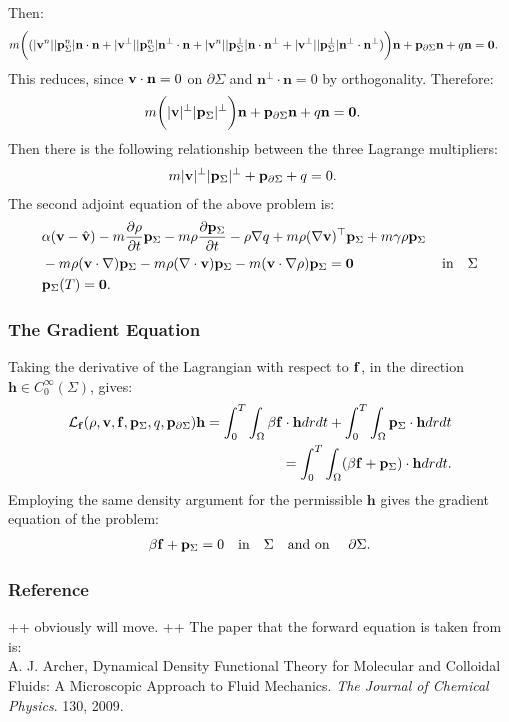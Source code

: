 Then:
\begin{align*}
&m \bigg((|\mathbf{v}^n||\mathbf{p}_\Sigma^n|\mathbf{n} \cdot \mathbf{n} + |\mathbf{v}^\perp||\mathbf{p}_\Sigma^n|\mathbf{n}^\perp \cdot \mathbf{n} + |\mathbf{v}^n||\mathbf{p}_\Sigma^\perp|\mathbf{n} \cdot\mathbf{n}^\perp+|\mathbf{v}^\perp||\mathbf{p}_\Sigma^\perp|\mathbf{n}^\perp \cdot \mathbf{n}^\perp)\bigg)\mathbf{n}+  \mathbf{p}_{\partial \Sigma}\mathbf{n} + q \mathbf{n} =\mathbf{0}.
\end{align*}
This reduces, since $\mathbf{v} \cdot \mathbf{n}=0$ on $\partial \Sigma$  and $\mathbf{n}^\perp \cdot \mathbf{n}=0$ by orthogonality. Therefore:
\begin{align*}
&m \bigg(|\mathbf{v}|^\perp|\mathbf{p}_\Sigma|^\perp\bigg)\mathbf{n}+  \mathbf{p}_{\partial \Sigma}\mathbf{n} + q \mathbf{n} =\mathbf{0}.
\end{align*}
Then there is the following relationship between the three Lagrange multipliers:
\begin{align*}
&m |\mathbf{v}|^\perp|\mathbf{p}_\Sigma|^\perp+  \mathbf{p}_{\partial \Sigma} + q  =0.
\end{align*}
The second adjoint equation of the above problem is:
\begin{align*}
&\alpha(\Stav - \hat \Stav)   - m \frac{\partial \Sta}{\partial t} \Adja  -  m\Sta \frac{\partial \Adja}{\partial t} 
-\Sta\nabla \Adjb +m \Sta (\nabla \Stav)^\top \Adja +m \gamma \Sta \Adja \\
&-m \Sta (\Stav \cdot \nabla)\Adja - m \Sta (\nabla \cdot \Stav)\Adja  - m (\Stav \cdot \nabla \Sta)\Adja=\mathbf{0} \ \qquad\qquad \qquad\text{in} \quad \Sigma\\
&\Adja(T)=\mathbf{0}.
\end{align*}

\subsubsection*{The Gradient Equation}
Taking the derivative of the Lagrangian with respect to $\mathbf{f}$, in the direction $\mathbf{h} \in C_0^\infty(\Sigma)$, gives:
\begin{align*}
\mathcal{L}_{\mathbf{f}} (\rho,\mathbf{v},\mathbf{f},\mathbf{p}_\Sigma,q,\mathbf{p}_{\partial \Sigma}) \mathbf{h}= \int_0^T \int_\Omega \beta \mathbf{f} \cdot \mathbf{h} dr dt + \int_0^T \int_\Omega \mathbf{p}_\Sigma \cdot \mathbf{h} dr dt \\
= \int_0^T \int_\Omega ( \beta \mathbf{f} + \mathbf{p}_\Sigma) \cdot \mathbf{h} dr dt.
\end{align*}
Employing the same density argument for the permissible $\mathbf{h}$ gives the gradient equation of the problem:
\begin{align*}
 \beta \mathbf{f} + \mathbf{p}_\Sigma=0 \quad \text{in} \quad \Sigma \quad \text{and on } \quad \partial\Sigma.
\end{align*}


\subsubsection*{Reference}
++ obviously will move. ++
The paper that the forward equation is taken from is:\\

A. J. Archer, Dynamical Density Functional Theory for Molecular and Colloidal Fluids: A Microscopic Approach to Fluid Mechanics. \textit{The Journal of Chemical Physics}. 130, 2009.
